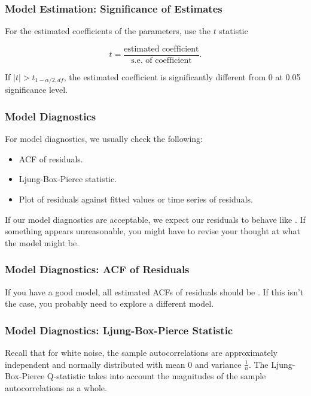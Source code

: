 \documentclass[%
xcolor=pdftex]{beamer}
\begin{document}
\begin{frame}
\frametitle{Model Estimation: Significance of Estimates}

For the estimated coefficients of the parameters, use the $t$ statistic

$$
t = \frac{\mbox{estimated coefficient}}{\mbox{s.e. of coefficient}}.
$$

If $|t| > t_{1 - \alpha/2, df}$, the estimated coefficient is significantly different from 0 at 0.05 significance level.

\end{frame}



\begin{frame}
\frametitle{Model Diagnostics}

For model diagnostics, we usually check the following:

\begin{itemize}
\item ACF of residuals.
\item Ljung-Box-Pierce statistic.
\item Plot of residuals against fitted values or time series of residuals.
\end{itemize}

If our model diagnostics are acceptable, we expect our residuals to behave like \underline{\hspace{20 mm}}. If something appears unreasonable, you might have to revise your thought at what the model might be.

\end{frame}

\begin{frame}
\frametitle{Model Diagnostics: ACF of Residuals}

If you have a good model, all estimated ACFs of residuals should be \underline{\hspace{25 mm}}. If this isn't the case, you probably need to explore a different model.

\end{frame}


\begin{frame}
\frametitle{Model Diagnostics: Ljung-Box-Pierce Statistic}

Recall that for white noise, the sample autocorrelations are approximately independent and normally distributed with mean 0 and variance $\frac{1}{n}$. The Ljung-Box-Pierce Q-statistic takes into account the magnitudes of the sample autocorrelations as a whole.

\end{frame}
\end{document}
